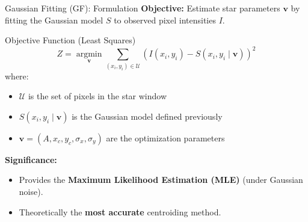 \begin{frame}{Gaussian Fitting (GF): Formulation}
    \textbf{Objective:} Estimate star parameters $\mathbf{v}$ by fitting the Gaussian model $S$ to observed pixel intensities $I$.
    
    \vspace{0.2cm}
    \begin{block}{Objective Function (Least Squares)}
        \[
            Z = \operatorname*{argmin}_{\mathbf{v}} \sum_{(x_i, y_i) \in \mathcal{U}} \left( I(x_i, y_i) - S(x_i, y_i \mid \mathbf{v}) \right)^2
        \]
        where:
        \begin{itemize}
            \item $\mathcal{U}$ is the set of pixels in the star window
            \item $S(x_i, y_i \mid \mathbf{v})$ is the Gaussian model defined previously
            \item $\mathbf{v} = (A, x_c, y_c, \sigma_x, \sigma_y)$ are the optimization parameters
        \end{itemize}
    \end{block}

    \vspace{0.2cm}
    \textbf{Significance:}
    \begin{itemize}
        \item Provides the \textbf{Maximum Likelihood Estimation (MLE)} (under Gaussian noise).
        \item Theoretically the \textbf{most accurate} centroiding method.
    \end{itemize}
\end{frame}


